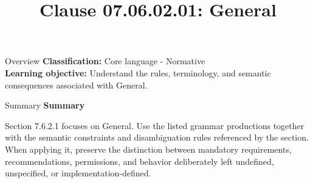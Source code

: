 \documentclass[10pt,letterpaper]{article}
\title{Clause 07.06.02.01: General}
\author{}
\date{}
\begin{document}
\maketitle
\begin{CornellOverviewBox}{Overview}
\textbf{Classification:} Core language - Normative\\[2pt]
\textbf{Learning objective:} Understand the rules, terminology, and semantic consequences associated with General.
\end{CornellOverviewBox}\begin{CornellSummaryBox}{Summary}
{\sffamily\bfseries\color{Accent} Summary}\par\vspace{3pt}Section 7.6.2.1 focuses on General. Use the listed grammar productions together with the semantic constraints and disambiguation rules referenced by the section. When applying it, preserve the distinction between mandatory requirements, recommendations, permissions, and behavior deliberately left undefined, unspecified, or implementation-defined.
\end{CornellSummaryBox}
\end{document}
